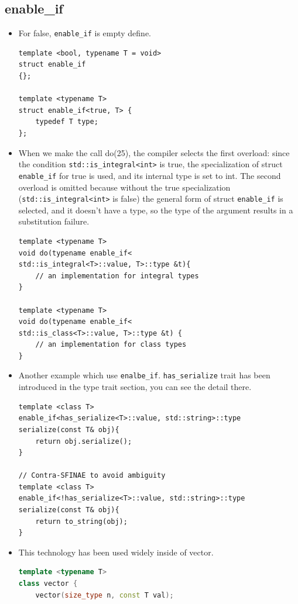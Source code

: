 \documentclass[a4paper,11pt,twoside]{book}
\begin{document}
\subsection{enable\_if}
\begin{itemize}
	
	\item For false, \texttt{enable\_if} is empty define.
\begin{lstlisting}[numbers=none]
template <bool, typename T = void>
struct enable_if
{};

template <typename T>
struct enable_if<true, T> {
	typedef T type;
};	
\end{lstlisting}	

\item When we make the call do(25), the compiler selects the first overload: since the condition \texttt{std::is\_integral<int>} is true, the specialization of struct \texttt{enable\_if} for true is used, and its internal type is set to int. The second overload is omitted because without the true specialization (\texttt{std::is\_integral<int>} is false) the general form of struct \texttt{enable\_if} is selected, and it doesn't have a type, so the type of the argument results in a substitution failure.

\begin{lstlisting}[numbers=none]
template <typename T>
void do(typename enable_if<
std::is_integral<T>::value, T>::type &t){
	// an implementation for integral types 
}

template <typename T>
void do(typename enable_if<
std::is_class<T>::value, T>::type &t) {
	// an implementation for class types
}		
\end{lstlisting}	
	
	\item Another example which use \texttt{enalbe\_if}. \texttt{has\_serialize} trait has been introduced in the type trait section, you can see the detail there. 
	
\begin{lstlisting}[numbers=none]
template <class T>
enable_if<has_serialize<T>::value, std::string>::type
serialize(const T& obj){
	return obj.serialize();
}

// Contra-SFINAE to avoid ambiguity
template <class T>
enable_if<!has_serialize<T>::value, std::string>::type 
serialize(const T& obj){
	return to_string(obj);
}	
\end{lstlisting}	
	
	\item This technology has been used widely inside of vector.
\begin{lstlisting}[frame=single, language=c++]
template <typename T>
class vector {
	vector(size_type n, const T val);
	

\end{lstlisting}
\end{itemize}
\end{document}
